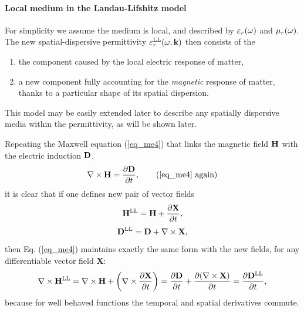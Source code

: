 \paragraph{Local medium in the Landau-Lifshitz model} %
For simplicity we assume %
the medium is local, and described by $\varepsilon_r(\omega)$ and $\mu_r(\omega)$.
The new spatial-dispersive permittivity $\varepsilon_r^\text{LL}(\omega, {\mathbf{k}})$ then consists of the 
\begin{enumerate}
 \item{the component caused by the local electric response of matter,} 
 \item{a new component fully accounting for the \textit{magnetic} response of matter, thanks to a particular shape of its spatial dispersion.}
\end{enumerate}
This model may be easily extended later to describe any spatially dispersive media within the permittivity, as will be shown later.   

Repeating the Maxwell equation (\ref{eq_me4}) that links the magnetic field $\mathbf{H}$ with the electric induction $\mathbf{D}$, 
\begin{equation} \nabla \times \HH =  \frac{\partial \D} {\partial t}, \tag{\ref{eq_me4} \again} \end{equation}
it is clear that if one defines new pair of vector fields
\begin{equation} {\mathbf{H}^\text{LL}} = \mathbf{H} + \frac{\partial\mathbf{X}}{\partial t}, \label{eq_HHsd}\end{equation}
\begin{equation} {\mathbf{D}^\text{LL}}  = \mathbf{D}  + \nabla\times \mathbf{X}, \label{eq_Dsd}\end{equation}
then Eq. (\ref{eq_me4}) maintains exactly the same form with the new fields, for any differentiable vector field $\mathbf{X}$:
\begin{equation} \nabla \times {\mathbf{H}^\text{LL}} = \nabla \times \mathbf{H} + \left(\nabla\times \frac{\partial\mathbf{X}}{\partial t}\right) = \frac{\partial \mathbf{D}}{\partial t}+ \frac{\partial(\nabla\times \mathbf{X})}{\partial t} =  \frac{\partial {\mathbf{D}^\text{LL}}} {\partial t}, \label{eq_me4sd} \end{equation}
because for well behaved functions the temporal and spatial derivatives commute.

